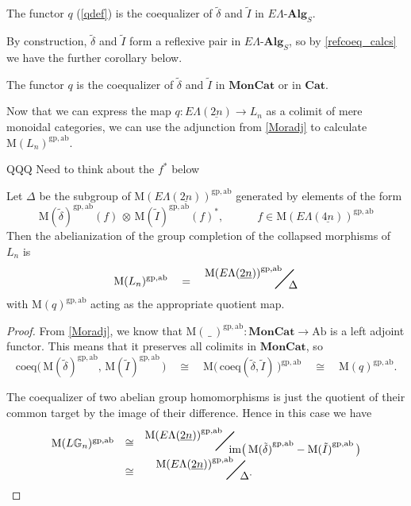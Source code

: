 \documentclass{amsbook} %
\newcommand{\mb}{\mathbf}
\newcommand{\bigquotient}[2]{ \raisebox{0.75\height}{$#1$} \mkern-12mu\scalebox{2}{$\diagup$}\mkern-10mu \raisebox{-0.5\height}{$#2$} }
\newcommand{\ELnn}{E\Lambda(\underline{2n})}
\newcommand{\ELnnnn}{E\Lambda(\underline{4n})}
\newcommand{\moncat}{\ensuremath{\mb{MonCat}}}
\newcommand{\cat}{\ensuremath{\mb{Cat}}}
\numberwithin{section}{chapter}
\begin{document}
\begin{cor}\label{q_other_coeq} The functor $q$ (\cref{qdef}) is the coequalizer of $\tilde{\delta}$ and $\tilde{I}$ in $E\Lambda\mbox{-}\mb{Alg}_S$.
\end{cor}

By construction, $\tilde{\delta}$ and $\tilde{I}$ form a reflexive pair in $E\Lambda\mbox{-}\mb{Alg}_S$, so by \cref{refcoeq_calcs} we have the further corollary below.

\begin{cor}\label{q_other_coeq2} The functor $q$  is the coequalizer of $\tilde{\delta}$ and $\tilde{I}$ in $\moncat$ or in $\cat$.
\end{cor}

Now that we can  express the map $q: \ELnn \to L_n$ as a colimit of mere monoidal categories, we can use the adjunction from \cref{Moradj} to calculate $\mathrm{M}(L_n)^{\mathrm{gp},\mathrm{ab}}$. 

QQQ Need to think about the $f^*$ below

\begin{prop}\label{Zmor2} Let $\Delta$ be the subgroup of $\mathrm{M}(\ELnn)^{\mathrm{gp, ab}}$ generated by elements of the form
\[ \mathrm{M}(\tilde{\delta})^{\mathrm{gp, ab}}(f) \, \otimes \, \mathrm{M}(\tilde{I})^{\mathrm{gp, ab}}(f)^*, \quad \quad \quad f \in \mathrm{M}(\ELnnnn)^{\mathrm{gp, ab}} \]
Then the abelianization of the group completion of the collapsed morphisms of $L_n$ is 
\[ \mathrm{M}(L_n)^{\mathrm{gp, ab}} \quad = \quad \bigquotient{{\mathrm{M}(\ELnn)}^{\mathrm{gp, ab}}}{\Delta} \]
with $\mathrm{M}(q)^{\mathrm{gp, ab}}$ acting as the appropriate quotient map. 
\end{prop}
\begin{proof}
From \cref{Moradj}, we know that $\mathrm{M}(\, \_ \,)^{\mathrm{gp, ab}}: \moncat \to \mathrm{Ab}$ is a left adjoint functor. This means that it preserves all colimits in $\moncat$, so
\[ \mathrm{coeq}\big( \, \mathrm{M}(\tilde{\delta})^{\mathrm{gp, ab}}, \, \mathrm{M}(\tilde{I})^{\mathrm{gp, ab}} \, \big) \quad \cong \quad \mathrm{M}\big( \, \mathrm{coeq}(\tilde{\delta}, \tilde{I}) \, \big)^{\mathrm{gp, ab}} \quad \cong \quad \mathrm{M}(q)^{\mathrm{gp, ab}}. \]

The coequalizer of two abelian group homomorphisms is just the quotient of their common target by the image of their difference. Hence in this case we have
\[ 
\begin{array}{rcl}
\mathrm{M}(L\mathbb{G}_{n})^{\mathrm{gp, ab}}  & \cong &  \bigquotient{{\mathrm{M}(\ELnn)}^{\mathrm{gp, ab}}}{\mathrm{im}\big( \, {\mathrm{M}(\tilde{\delta})}^{\mathrm{gp, ab}} - {\mathrm{M}(\tilde{I})}^{\mathrm{gp, ab}} \, \big)} \\
& \cong & \quad \bigquotient{{\mathrm{M}(\ELnn)}^{\mathrm{gp, ab}}}{\Delta}.
\end{array}
\]
\end{proof} 
\end{document}
